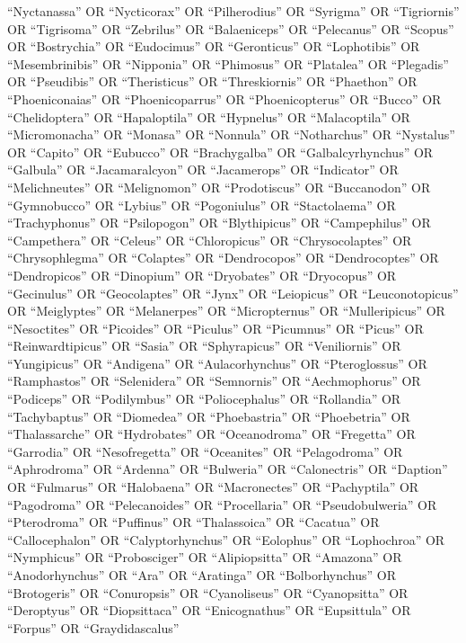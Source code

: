 \documentclass[
  number,
  review,
  onecolumn]{elsarticle}
\begin{document}
``Nyctanassa'' OR ``Nycticorax'' OR ``Pilherodius'' OR ``Syrigma'' OR
``Tigriornis'' OR ``Tigrisoma'' OR ``Zebrilus'' OR ``Balaeniceps'' OR
``Pelecanus'' OR ``Scopus'' OR ``Bostrychia'' OR ``Eudocimus'' OR
``Geronticus'' OR ``Lophotibis'' OR ``Mesembrinibis'' OR ``Nipponia'' OR
``Phimosus'' OR ``Platalea'' OR ``Plegadis'' OR ``Pseudibis'' OR
``Theristicus'' OR ``Threskiornis'' OR ``Phaethon'' OR ``Phoeniconaias''
OR ``Phoenicoparrus'' OR ``Phoenicopterus'' OR ``Bucco'' OR
``Chelidoptera'' OR ``Hapaloptila'' OR ``Hypnelus'' OR ``Malacoptila''
OR ``Micromonacha'' OR ``Monasa'' OR ``Nonnula'' OR ``Notharchus'' OR
``Nystalus'' OR ``Capito'' OR ``Eubucco'' OR ``Brachygalba'' OR
``Galbalcyrhynchus'' OR ``Galbula'' OR ``Jacamaralcyon'' OR
``Jacamerops'' OR ``Indicator'' OR ``Melichneutes'' OR ``Melignomon'' OR
``Prodotiscus'' OR ``Buccanodon'' OR ``Gymnobucco'' OR ``Lybius'' OR
``Pogoniulus'' OR ``Stactolaema'' OR ``Trachyphonus'' OR ``Psilopogon''
OR ``Blythipicus'' OR ``Campephilus'' OR ``Campethera'' OR ``Celeus'' OR
``Chloropicus'' OR ``Chrysocolaptes'' OR ``Chrysophlegma'' OR
``Colaptes'' OR ``Dendrocopos'' OR ``Dendrocoptes'' OR ``Dendropicos''
OR ``Dinopium'' OR ``Dryobates'' OR ``Dryocopus'' OR ``Gecinulus'' OR
``Geocolaptes'' OR ``Jynx'' OR ``Leiopicus'' OR ``Leuconotopicus'' OR
``Meiglyptes'' OR ``Melanerpes'' OR ``Micropternus'' OR ``Mulleripicus''
OR ``Nesoctites'' OR ``Picoides'' OR ``Piculus'' OR ``Picumnus'' OR
``Picus'' OR ``Reinwardtipicus'' OR ``Sasia'' OR ``Sphyrapicus'' OR
``Veniliornis'' OR ``Yungipicus'' OR ``Andigena'' OR ``Aulacorhynchus''
OR ``Pteroglossus'' OR ``Ramphastos'' OR ``Selenidera'' OR ``Semnornis''
OR ``Aechmophorus'' OR ``Podiceps'' OR ``Podilymbus'' OR
``Poliocephalus'' OR ``Rollandia'' OR ``Tachybaptus'' OR ``Diomedea'' OR
``Phoebastria'' OR ``Phoebetria'' OR ``Thalassarche'' OR ``Hydrobates''
OR ``Oceanodroma'' OR ``Fregetta'' OR ``Garrodia'' OR ``Nesofregetta''
OR ``Oceanites'' OR ``Pelagodroma'' OR ``Aphrodroma'' OR ``Ardenna'' OR
``Bulweria'' OR ``Calonectris'' OR ``Daption'' OR ``Fulmarus'' OR
``Halobaena'' OR ``Macronectes'' OR ``Pachyptila'' OR ``Pagodroma'' OR
``Pelecanoides'' OR ``Procellaria'' OR ``Pseudobulweria'' OR
``Pterodroma'' OR ``Puffinus'' OR ``Thalassoica'' OR ``Cacatua'' OR
``Callocephalon'' OR ``Calyptorhynchus'' OR ``Eolophus'' OR
``Lophochroa'' OR ``Nymphicus'' OR ``Probosciger'' OR ``Alipiopsitta''
OR ``Amazona'' OR ``Anodorhynchus'' OR ``Ara'' OR ``Aratinga'' OR
``Bolborhynchus'' OR ``Brotogeris'' OR ``Conuropsis'' OR ``Cyanoliseus''
OR ``Cyanopsitta'' OR ``Deroptyus'' OR ``Diopsittaca'' OR
``Enicognathus'' OR ``Eupsittula'' OR ``Forpus'' OR ``Graydidascalus''
\end{document}
